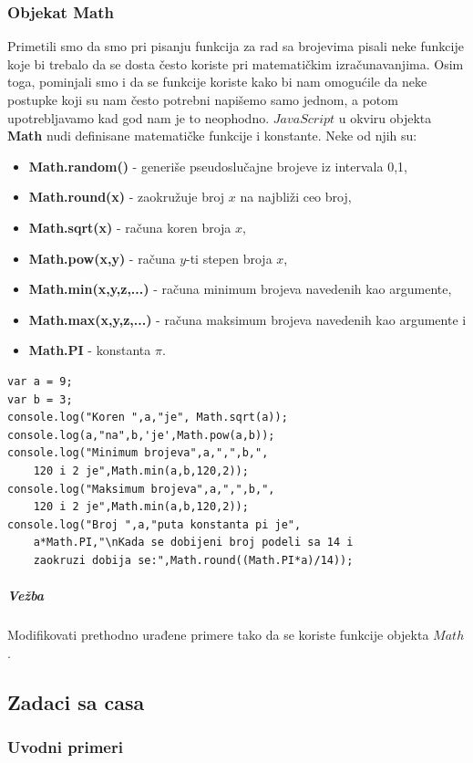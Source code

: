 \documentclass[a4paper]{article}
\begin{document}
\subsubsection{Objekat Math}
Primetili smo da smo pri pisanju funkcija za rad sa brojevima pisali neke funkcije koje bi trebalo da se dosta često koriste pri matematičkim izračunavanjima. Osim toga, pominjali smo i da se funkcije koriste kako bi nam omogućile da neke postupke koji su nam često potrebni napišemo samo jednom, a potom upotrebljavamo kad god nam je to neophodno. $JavaScript$ u okviru objekta \textbf{Math} nudi definisane matematičke funkcije i konstante. Neke od njih su:
\begin{itemize}
	\item \textbf{Math.random()} - generiše pseudoslučajne brojeve iz intervala 0,1, 
	\item \textbf{Math.round(x)} - zaokružuje broj $x$ na najbliži ceo broj,  
	\item \textbf{Math.sqrt(x)} - računa koren broja $x$, 
	\item \textbf{Math.pow(x,y)} - računa $y$-ti stepen broja $x$,  
	\item \textbf{Math.min(x,y,z,...)} - računa minimum brojeva navedenih kao argumente,
	\item \textbf{Math.max(x,y,z,...)} - računa maksimum brojeva navedenih kao argumente i
	\item \textbf{Math.PI} - konstanta $\pi$.
\end{itemize} 
\begin{lstlisting}[backgroundcolor = \color{lightgray}]
var a = 9;
var b = 3;
console.log("Koren ",a,"je", Math.sqrt(a));
console.log(a,"na",b,'je',Math.pow(a,b));
console.log("Minimum brojeva",a,",",b,", 
	120 i 2 je",Math.min(a,b,120,2));
console.log("Maksimum brojeva",a,",",b,",
	120 i 2 je",Math.min(a,b,120,2));
console.log("Broj ",a,"puta konstanta pi je", 
	a*Math.PI,"\nKada se dobijeni broj podeli sa 14 i 
	zaokruzi dobija se:",Math.round((Math.PI*a)/14));
\end{lstlisting}


\subparagraph{Vežba}
Modifikovati prethodno urađene primere tako da se koriste funkcije objekta $Math$.

\subsection{Zadaci sa casa}
\subsubsection{Uvodni primeri}
\end{document}
